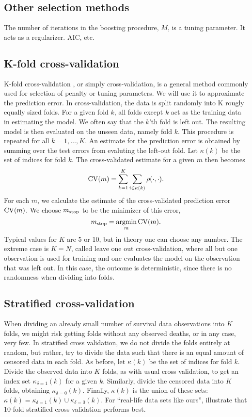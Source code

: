 \subsection{Other selection methods}
The number of iterations in the boosting procedure, $M$, is a tuning parameter. It acts as a regularizer. AIC, etc.

\subsection{K-fold cross-validation}
K-fold cross-validation \citep{lachenbruch}, or simply cross-validation, is a general method commonly used for selection of penalty or tuning parameters. We will use it to approximate the prediction error. In cross-validation, the data is split randomly into K rougly equally sized folds. For a given fold $k$, all folds except $k$ act as the training data in estimating the model. We often say that the $k$'th fold is left out. The resulting model is then evaluated on the unseen data, namely fold $k$. This procedure is repeated for all $k=1,\ldots,K$. An estimate for the prediction error is obtained by summing over the test errors from evaluting the left-out fold. Let $\kappa(k)$ be the set of indices for fold $k$. The cross-validated estimate for a given $m$ then becomes
\begin{equation}
    \operatorname{CV}(m)=\sum_{k=1}^K\sum_{i\in\kappa(k)}\rho(\cdot,\cdot).
\end{equation}
For each $m$, we calculate the estimate of the cross-validated prediction error $\operatorname{CV}(m)$. We choose $m_{\text{stop}}$ to be the minimizer of this error,
\begin{equation}
    m_{\text{stop}}=\operatorname*{argmin}_{m}\operatorname{CV}(m).
\end{equation}
Typical values for $K$ are 5 or 10, but in theory one can choose any number. The extreme case is $K=N$, called leave one out cross-validation, where all but one observation is used for training and one evaluates the model on the observation that was left out. In this case, the outcome is deterministic, since there is no randomness when dividing into folds.

\subsection{Stratified cross-validation}
When dividing an already small number of survival data observations into $K$ folds, we might risk getting folds without any observed deaths, or in any case, very few. In stratified cross validation, we do not divide the folds entirely at random, but rather, try to divide the data such that there is an equal amount of censored data in each fold.
As before, let $\kappa(k)$ be the set of indices for fold $k$. Divide the observed data into $K$ folds, as with usual cross validation, to get an index set $\kappa_{\delta=1}(k)$ for a given $k$. Similarly, divide the censored data into $K$ folds, obtaining $\kappa_{\delta=0}(k)$. Finally, $\kappa(k)$ is the union of these sets: $\kappa(k)=\kappa_{\delta=1}(k)\cup\kappa_{\delta=0}(k)$. For ``real-life data sets like ours'', \citet{kohavi} illustrate that 10-fold stratified cross validation performs best.

